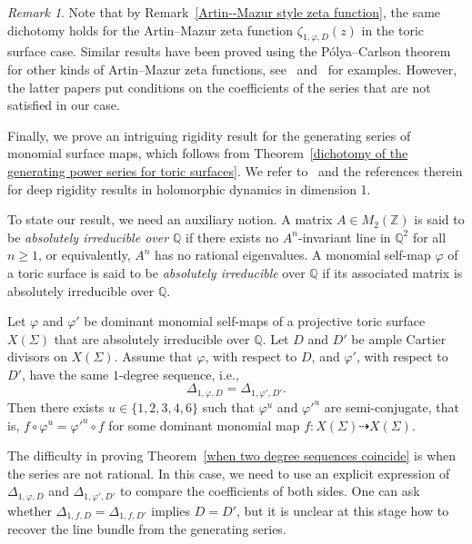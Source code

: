 \documentclass[11pt,a4paper]{article}
\theoremstyle{plain}
\theoremstyle{remark}
\newtheorem{remark}[theorem]{Remark}
\theoremstyle{custombold}
\newenvironment{customtheorem}[1]
  {\renewcommand\theinnercustomtheorem{#1}\innercustomtheorem}
  {\endinnercustomtheorem}
\begin{document}
\begin{remark}
	Note that by Remark~\ref{Artin--Mazur style zeta function}, the same dichotomy holds for the Artin--Mazur zeta function $\zeta_{1,\varphi,D}(z)$ in the toric surface case. Similar results have been proved using the P\'olya--Carlson theorem for other kinds of Artin--Mazur zeta functions, see~\cite[Corollary~10.4]{Milnor-Thurston-1988}
 and~\cite[Theorem~4.2]{Nguyen-Bell-Gunn-Saunders-2023} for examples. However, the latter papers put conditions on the coefficients of the series that are not satisfied in our case.
\end{remark}

Finally, we prove an intriguing rigidity result for the generating series of monomial surface maps, which follows from Theorem~\ref{dichotomy of the generating power series for toric surfaces}. We refer to~\cite{Ji-Xie-2023} and the references therein for deep rigidity results in holomorphic dynamics in dimension 1.

To state our result, we need an auxiliary notion. A matrix $A \in M_2(\mathbb Z)$ is said to be \emph{absolutely irreducible over $\mathbb Q$} if there exists no $A^n$-invariant line in $\mathbb Q^2$ for all $n\geq1$, or equivalently, $A^n$ has no rational eigenvalues. A monomial self-map $\varphi$ of a toric surface is said to be \emph{absolutely irreducible} over $\mathbb Q$ if its associated matrix is absolutely irreducible over $\mathbb Q$. 

\begin{customtheorem}{E}\label{when two degree sequences coincide}
    Let $\varphi$ and $\varphi'$ be dominant monomial self-maps of a projective toric surface $X(\Sigma)$ that are absolutely irreducible over $\mathbb Q$. Let $D$ and $D'$ be ample Cartier divisors on $X(\Sigma)$. Assume that $\varphi$, with respect to $D$, and $\varphi'$, with respect to $D'$, have the same $1$-degree sequence, i.e., $$\Delta_{1,\varphi,D}=\Delta_{1,\varphi',D'}.$$
    Then there exists $u\in\{1,2,3,4,6\}$ such that $\varphi^u$ and $\varphi'^u$ are semi-conjugate, that is, $f\circ \varphi^u=\varphi'^u\circ f $ for some dominant monomial map $f:X(\Sigma)\dashrightarrow X(\Sigma)$.
\end{customtheorem}

The difficulty in proving Theorem~\ref{when two degree sequences coincide} is when the series are not rational. In this case, we need to use an explicit expression of $\Delta_{1,\varphi,D}$ and $\Delta_{1,\varphi',D'}$ to compare the coefficients of both sides. One can ask whether $\Delta_{1,f,D} = \Delta_{1,f,D'}$ implies $D= D'$, but it is unclear at this stage how to recover the line bundle from the generating series.
\end{document}
